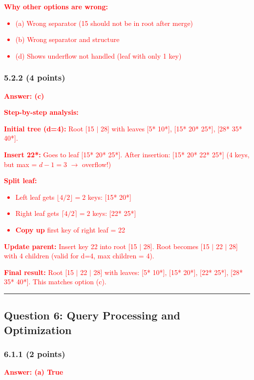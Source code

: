 \documentclass[11pt,a4paper]{article}
\begin{document}
\textcolor{red}{\textbf{Why other options are wrong:}
\begin{itemize}
\item (a) Wrong separator (15 should not be in root after merge)
\item (b) Wrong separator and structure
\item (d) Shows underflow not handled (leaf with only 1 key)
\end{itemize}}

\subsubsection*{5.2.2 (4 points)}
\textcolor{red}{\textbf{Answer: (c)}}

\textcolor{red}{\textbf{Step-by-step analysis:}}

\textcolor{red}{\textbf{Initial tree (d=4):} Root [15 $|$ 28] with leaves [5* 10*], [15* 20* 25*], [28* 35* 40*].}

\textcolor{red}{\textbf{Insert 22*:} Goes to leaf [15* 20* 25*].
After insertion: [15* 20* 22* 25*] (4 keys, but max = $d-1 = 3$ $\rightarrow$ overflow!)}

\textcolor{red}{\textbf{Split leaf:}
\begin{itemize}
\item Left leaf gets $\lfloor 4/2 \rfloor = 2$ keys: [15* 20*]
\item Right leaf gets $\lceil 4/2 \rceil = 2$ keys: [22* 25*]
\item \textbf{Copy up} first key of right leaf = 22
\end{itemize}}

\textcolor{red}{\textbf{Update parent:} Insert key 22 into root [15 $|$ 28].
Root becomes [15 $|$ 22 $|$ 28] with 4 children (valid for d=4, max children = 4).}

\textcolor{red}{\textbf{Final result:} Root [15 $|$ 22 $|$ 28] with leaves:
[5* 10*], [15* 20*], [22* 25*], [28* 35* 40*]. This matches option (c).}

\hrule
\vspace{1em}

\subsection*{Question 6: Query Processing and Optimization}

\subsubsection*{6.1.1 (2 points)}
\textcolor{red}{\textbf{Answer: (a) True}}
\end{document}
